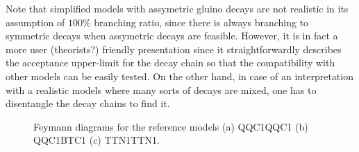 Note that simplified models with assymetric gluino decays are not realistic in its assumption of $100\%$ branching ratio, since there is always branching to symmetric decays when assymetric decays are feasible. However, it is in fact a more user (theorists?) friendly presentation since it straightforwardly describes the acceptance upper-limit for the decay chain so that the compatibility with other models can be easily tested. On the other hand, in case of an interpretation with a realistic models where many sorts of decays are mixed, one has to  disentangle the decay chains to find it.







\begin{figure}[h]
  \centering
    \caption{ Feymann diagrams for the reference models (a) QQC1QQC1 (b) QQC1BTC1 (c) TTN1TTN1. }
    \label{fig:Introduction::refModels}
\end{figure}




